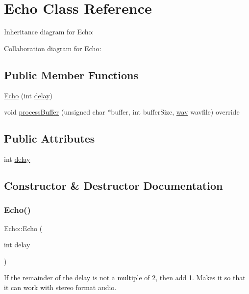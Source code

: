 \hypertarget{classEcho}{}\section{Echo Class Reference}
\label{classEcho}


Inheritance diagram for Echo\+:


Collaboration diagram for Echo\+:
\subsection*{Public Member Functions}
\begin{DoxyCompactItemize}
\item 
\hyperlink{classEcho_a9531515ffab8be1e38cbdc0e0e9338a6}{Echo} (int \hyperlink{classEcho_abf5c35aa942bfae1832de23bb261e444}{delay})
\item 
void \hyperlink{classEcho_af63c5069f6263bfb0a9f2b3ed0cef2f6}{process\+Buffer} (unsigned char $\ast$buffer, int buffer\+Size, \hyperlink{classwav}{wav} wavfile) override
\end{DoxyCompactItemize}
\subsection*{Public Attributes}
\begin{DoxyCompactItemize}
\item 
int \hyperlink{classEcho_abf5c35aa942bfae1832de23bb261e444}{delay}
\end{DoxyCompactItemize}


\subsection{Constructor \& Destructor Documentation}
\mbox{\label{classEcho_a9531515ffab8be1e38cbdc0e0e9338a6}} 
\subsubsection{\texorpdfstring{Echo()}{Echo()}}
{\footnotesize\ttfamily Echo\+::\+Echo (\begin{DoxyParamCaption}\item[{int}]{delay }\end{DoxyParamCaption})}

If the remainder of the delay is not a multiple of 2, then add 1. Makes it so that it can work with stereo format audio. 

